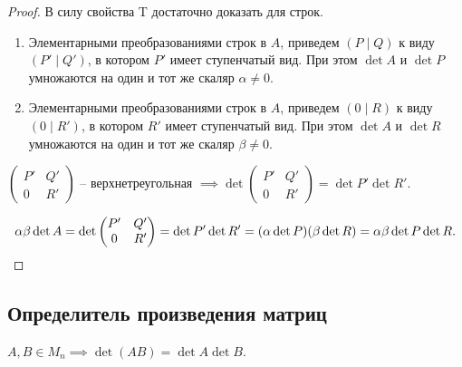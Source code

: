 \begin{proof}
    В силу свойства T достаточно доказать для строк.

    \begin{enumerate}
    \item
        Элементарными преобразованиями строк в $A$, приведем $(P \mid Q)$ к виду $(P' \mid Q')$, в котором $P'$ имеет ступенчатый вид. При этом $\det A$ и $\det P$ умножаются на один и тот же скаляр $\alpha \neq 0$.

    \item
        Элементарными преобразованиями строк в $A$, приведем $(0 \mid R)$ к виду $(0 \mid R')$, в котором $R'$ имеет ступенчатый вид. При этом $\det A$ и $\det R$ умножаются на один и тот же скаляр $\beta \neq 0$.
    \end{enumerate}

    $\begin{pmatrix} P' & Q' \\ 0 & R' \end{pmatrix} $ -- верхнетреугольная $\implies \det \begin{pmatrix} P' & Q' \\ 0 & R' \end{pmatrix} = \det P' \det R'$.

    \begin{equation*}
        \alpha \beta \det A = \det \begin{pmatrix} P' & Q' \\ 0 & R' \end{pmatrix} = \det P' \det R' = (\alpha \det P) (\beta \det R) = \alpha \beta \det P \det R
    .\qedhere\end{equation*}
\end{proof}


\subsection{Определитель произведения матриц}
\begin{theorem}
    $A, B \in M_n \implies \det(AB) = \det A \det B$.
\end{theorem}

